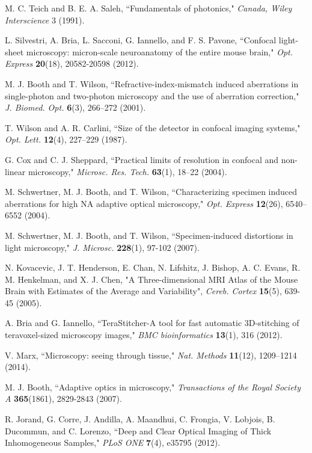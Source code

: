 \documentclass[12pt]{spieman}  %
\begin{document}
\begin{spacing}{2}
\begin{thebibliography}{0}
 M. C. Teich and B. E. A. Saleh, ``Fundamentals of photonics," \emph{Canada, Wiley Interscience} 3 (1991).

 L. Silvestri, A. Bria, L. Sacconi, G. Iannello,  and F. S. Pavone,  ``Confocal light-sheet microscopy: micron-scale neuroanatomy of the entire mouse brain," \emph{Opt. Express} \textbf{20}(18), 20582-20598 (2012).

 M. J. Booth and T. Wilson, ``Refractive-index-mismatch induced aberrations in single-photon and two-photon microscopy and the use of aberration correction," \emph{J. Biomed. Opt.} \textbf{6}(3), 266–272 (2001).

 T. Wilson and A. R. Carlini, ``Size of the detector in confocal imaging systems," \emph{Opt. Lett.} \textbf{12}(4), 227–229 (1987).

 G. Cox and C. J. Sheppard, ``Practical limits of resolution in confocal and non-linear microscopy," \emph{Microsc. Res. Tech.} \textbf{63}(1), 18–22 (2004).

 M. Schwertner, M. J. Booth, and T. Wilson, ``Characterizing specimen induced aberrations for high NA adaptive optical microscopy," \emph{Opt. Express} \textbf{12}(26), 6540–6552 (2004).

 M. Schwertner, M. J. Booth, and T. Wilson, ``Specimen‐induced distortions in light microscopy," \emph{J. Microsc.} \textbf{228}(1), 97-102 (2007).

 N. Kovacevic, J. T. Henderson, E. Chan, N. Lifshitz, J. Bishop, A. C. Evans, R. M. Henkelman, and X. J. Chen, "A Three-dimensional MRI Atlas of the Mouse Brain with Estimates of the Average and Variability", \emph{Cereb. Cortex} \textbf{15}(5), 639-45 (2005).

 A. Bria and G. Iannello,  ``TeraStitcher-A tool for fast automatic 3D-stitching of teravoxel-sized microscopy images,"  \emph{BMC bioinformatics} \textbf{13}(1), 316 (2012).

 V. Marx, ``Microscopy: seeing through tissue," \emph{Nat. Methods} \textbf{11}(12), 1209–1214 (2014).

 M. J. Booth, ``Adaptive optics in microscopy," \emph{Transactions of the Royal Society A} \textbf{365}(1861), 2829-2843 (2007).

 R. Jorand, G. Corre, J. Andilla, A. Maandhui, C. Frongia, V. Lobjois, B. Ducommun, and C. Lorenzo, ``Deep and Clear Optical Imaging of Thick Inhomogeneous Samples," \emph{PLoS ONE} \textbf{7}(4), e35795 (2012).


\end{thebibliography}
\end{spacing}
\end{document}
